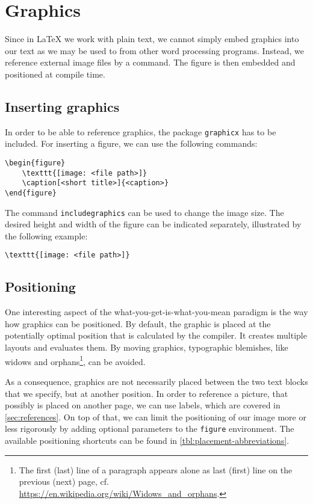 \chapter{Graphics}
\label{sec:graphics}

Since in \LaTeX{} we work with plain text, we cannot simply embed graphics into our text as we may be used to from other  word processing programs. 
Instead, we reference external image files by a command. The figure is then embedded and positioned at compile time.

\section{Inserting graphics}
\label{sec:display-graphics}
In order to be able to reference graphics, the package \texttt{graphicx} has to be included. For inserting a figure, we can use the following commands:
	
\begin{verbatim}
\begin{figure}
	\texttt{[image: <file path>]}
	\caption[<short title>]{<caption>}
\end{figure}
\end{verbatim}

\noindent The command \texttt{includegraphics} can be used to change the image size. The desired height and width of the figure can be indicated separately,  illustrated by the following example:

\begin{verbatim}
\texttt{[image: <file path>]}
\end{verbatim}

\section{Positioning}
\label{sec:graphics-placement}
One interesting aspect of the  what-you-get-is-what-you-mean paradigm is the way how graphics can be positioned. 
By default, the graphic is placed at the potentially optimal position that is calculated by the compiler. It creates multiple layouts and evaluates them. By moving graphics, typographic blemishes, like widows and orphans\footnote{The first (last) line of a paragraph appears alone as last (first) line on the previous (next) page, cf. \url{https://en.wikipedia.org/wiki/Widows_and_orphans}.}, can be avoided. 

As a consequence, graphics are not necessarily placed between the two text blocks that we specify, but at another position. 
In order to reference a picture, that possibly is placed on another page, we can use labels, which are covered in \cref{sec:references}. 
On top of that, we can limit the positioning of our image more or less rigorously by adding optional parameters to the \texttt{figure} environment. The available positioning shortcuts can be found in \cref{tbl:placement-abbreviations}.

